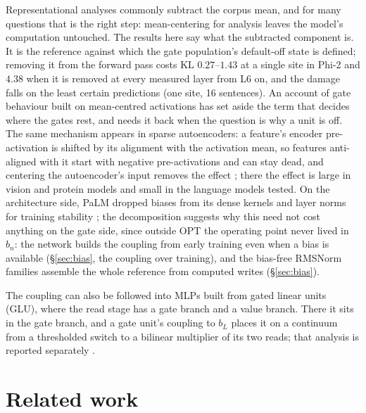 \documentclass[11pt]{article}
\newcommand{\bl}{b_L}
\begin{document}
Representational analyses commonly subtract the corpus mean, and for many
questions that is the right step: mean-centering for analysis leaves the
model's computation untouched. The results here say what the subtracted
component is. It is the reference against which the gate population's
default-off state is defined; removing it from the forward pass costs KL
$0.27$--$1.43$ at a single site in Phi-2 and $4.38$ when it is removed at
every measured layer from L6 on, and the damage falls on the least
certain predictions (one site, 16 sentences). An account of gate
behaviour built on mean-centred activations has set aside the term that
decides where the gates rest, and needs it back when the question is why
a unit is off. The same mechanism appears in sparse autoencoders: a
feature's encoder pre-activation is shifted by its alignment with the
activation mean, so features anti-aligned with it start with negative
pre-activations and can stay dead, and centering the autoencoder's input
removes the effect \citep{simon2026}; there the effect is large in
vision and protein models and small in the language models tested. On
the architecture side, PaLM dropped biases from its
dense kernels and layer norms for training stability
\citep{chowdhery2022}; the decomposition suggests why this need not cost
anything on the gate side, since outside OPT the operating point never
lived in $b_n$: the network builds the coupling from early training even
when a bias is available (\S\ref{sec:bias}, the coupling over training), and the bias-free RMSNorm
families assemble the whole reference from computed writes
(\S\ref{sec:bias}).

The coupling can also be followed into MLPs built from gated linear
units (GLU), where the read
stage has a gate branch and a value branch. There it sits in the gate
branch, and a gate unit's coupling to $\bl$ places it on a continuum
from a thresholded switch to a bilinear multiplier of its two reads; that
analysis is reported separately \citep{tuomi2026backgroundglu}.

\section{Related work}
\end{document}
